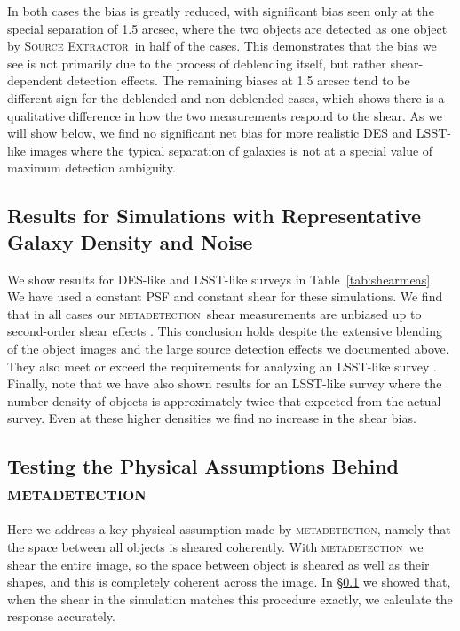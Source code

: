 \documentclass[iop, twocolappendix, appendixfloats, numberedappendix, apj]{hackemulateapj}
\newcommand{\mdet}{\textsc{metadetection}}
\newcommand{\sx}{\textsc{Source Extractor}}
\begin{document}
In both cases the bias is greatly reduced, with significant bias seen only at
the special separation of 1.5 arcsec, where the two objects are detected as one
object by \sx\ in half of the cases. This demonstrates that the bias we see is
not primarily due to the process of deblending itself, but rather
shear-dependent detection effects. The remaining biases at 1.5 arcsec tend to
be different sign for the deblended and non-deblended cases, which shows there
is a qualitative difference in how the two measurements respond to the shear.
As we will show below, we find no significant net bias for more realistic DES
and LSST-like images where the typical separation of galaxies is not at a
special value of maximum detection ambiguity.

\subsection{Results for Simulations with Representative Galaxy Density and Noise}
\label{sec:res:constpsf}

We show results for DES-like and LSST-like surveys in Table~\ref{tab:shearmeas}.
We have used a constant PSF and constant shear for these simulations. We find
that in all cases our \mdet\ shear measurements are unbiased up to
second-order shear effects \citep[we expect a bias of a few parts in 10000 for shears
of 0.02, see][]{SheldonMcal2017}. This conclusion holds despite the extensive blending
of the object images and the large source detection effects we documented
above. They also meet or exceed the requirements for analyzing an LSST-like survey
\citep[e.g.,][]{huterer2006}. Finally, note that we have also shown results for an
LSST-like survey where the number density of objects is approximately twice that
expected from the actual survey.  Even at these higher densities we find
no increase in the shear bias.

\subsection{Testing the Physical Assumptions Behind \mdet}
\label{sec:mdetphys}

Here we address a key physical assumption made by \mdet, namely that the space
between all objects is sheared coherently.   With \mdet\ we shear the entire
image, so the space between object is sheared as well as their shapes, and this
is completely coherent across the image.  In \S \ref{sec:res:constpsf} we
showed that, when the shear in the simulation matches this procedure exactly,
we calculate the response accurately.
\end{document}
